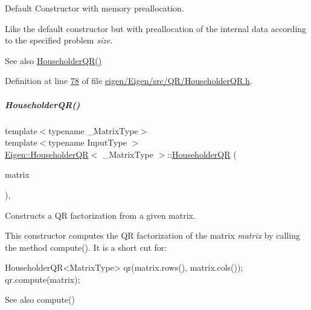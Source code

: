 Default Constructor with memory preallocation. 

Like the default constructor but with preallocation of the internal data according to the specified problem {\itshape size}. \begin{DoxySeeAlso}{See also}
\hyperlink{group___q_r___module_a974adb10a0e066057aeb3b360df68380}{Householder\+Q\+R()} 
\end{DoxySeeAlso}


Definition at line \hyperlink{eigen_2_eigen_2src_2_q_r_2_householder_q_r_8h_source_l00078}{78} of file \hyperlink{eigen_2_eigen_2src_2_q_r_2_householder_q_r_8h_source}{eigen/\+Eigen/src/\+Q\+R/\+Householder\+Q\+R.\+h}.

\mbox{\label{group___q_r___module_afa7cfb4faa89195c4dc8d196924c8230}} 
\subparagraph{\texorpdfstring{Householder\+Q\+R()}{HouseholderQR()}\hspace{0.1cm}{\footnotesize\ttfamily [3/8]}}
{\footnotesize\ttfamily template$<$typename \+\_\+\+Matrix\+Type$>$ \\
template$<$typename Input\+Type $>$ \\
\hyperlink{group___q_r___module_class_eigen_1_1_householder_q_r}{Eigen\+::\+Householder\+QR}$<$ \+\_\+\+Matrix\+Type $>$\+::\hyperlink{group___q_r___module_class_eigen_1_1_householder_q_r}{Householder\+QR} (\begin{DoxyParamCaption}\item[{const \hyperlink{group___core___module_struct_eigen_1_1_eigen_base}{Eigen\+Base}$<$ Input\+Type $>$ \&}]{matrix }\end{DoxyParamCaption})\hspace{0.3cm}{\ttfamily [inline]}, {\ttfamily [explicit]}}



Constructs a QR factorization from a given matrix. 

This constructor computes the QR factorization of the matrix {\itshape matrix} by calling the method compute(). It is a short cut for\+:


\begin{DoxyCode}
HouseholderQR<MatrixType> qr(matrix.rows(), matrix.cols());
qr.compute(matrix);
\end{DoxyCode}


\begin{DoxySeeAlso}{See also}
compute() 
\end{DoxySeeAlso}


